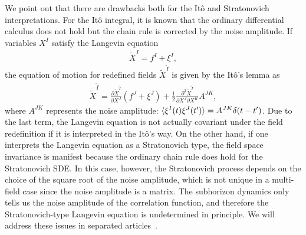\documentclass[a4paper,11pt]{article}
\newcommand{\pdif}[2]{\frac{\partial #1}{\partial #2}}
\newcommand{\IR}{\text{IR}}
\renewcommand{\Re}{\mathrm{Re}}
\newcommand{\bae}[1]{\begin{align} #1 \end{align}}
\begin{document}
We point out that there are drawbacks both for the It\^o and Stratonovich interpretations.
For the It\^o integral, it is known that the ordinary differential calculus does not hold but the chain rule is corrected by the noise amplitude.
If variables $X^I$ satisfy the Langevin equation
\bae{
	\dot{X}^I=f^I+\xi^I,
}
the equation of motion for redefined fields $\tilde{X}^{\tilde{I}}$ is given by the It\^o's lemma as
\bae{
	\dot{\tilde{X}}^{\tilde{I}}=\pdif{\tilde{X}^{\tilde{I}}}{X^J}\left(f^J+\xi^J\right)+\frac{1}{2}\frac{\partial^2\tilde{X}^{\tilde{I}}}{\partial X^J\partial X^K}A^{JK},
}
where $A^{JK}$ represents the noise amplitude: $\braket{\xi^I(t)\xi^J(t^\prime)}=A^{JK}\delta(t-t^\prime)$. Due to the last term, the Langevin equation is not
actually covariant under the field redefinition if it is interpreted in the It\^o's way.
On the other hand, if one interprets the Langevin equation as a Stratonovich type,
the field space invariance is manifest because the ordinary chain rule does hold for the Stratonovich SDE.
In this case, however, the Stratonovich process depends on the choice of the square root of the noise amplitude, which is not unique in a multi-field case since
the noise amplitude is a matrix. The subhorizon dynamics only tells us the noise amplitude of the correlation function, and therefore the Stratonovich-type Langevin
equation is undetermined in principle. 
We will address these issues in separated articles~\cite{1st,3rd,4th}.


\begin{comment}
Under the field space transformation $\varphi^I\to\varphi^{\prime A}(\varphi^I)$, the drift term $\frac{N_\IR}{a^3}\varpi^I$ for $\dot{\varphi}^I$ does not transform as a standard vector $\frac{N_\IR}{a^3}\varpi^{\prime A}=\pdif{\varphi^{\prime A}}{\varphi^I}\frac{N_\IR}{a^3}\varpi^I$ but does as $\frac{N_\IR}{a^3}\varpi^{\prime A}=\pdif{\varphi^{\prime A}}{\varphi^I}\frac{N_\IR}{a^3}\varpi^I+\frac{1}{2}\frac{\partial^2\varphi^{\prime A}}{\partial\varphi^I\partial\varphi^J}\Re\Pi_{QQ}{}^{IJ}$ according to the It\^o's lemma.
It means that the Hubble parameter given by the Friedmann equation~(\ref{eq: Friedmann eq}) is no longer field space invariant though it should be.
On the other hand, if one interprets the Langevin equation as a Stratonovich type,
the field space invariance is manifest because the ordinary chain rule does hold for the Stratonovich SDE.
In this case, however, the Stratonovich process is not invariant under the rotation of the noise basis and therefore it is undetermined because we only know the correlation of the noise.
Note that both drawbacks are proportional to the noise correlator (i.e. quadratic order of the noise) and there is no difference between the It\^o and Stratonovich definition at the linear order in noise.
We will address these issues in a separated article.
\end{comment}
\end{document}
